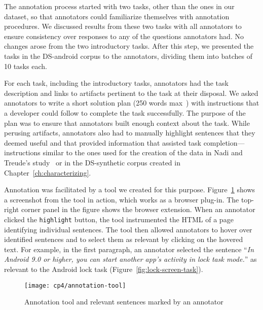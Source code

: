 The annotation process started with two tasks, other than the ones in our dataset, so that annotators could familiarize themselves with annotation procedures.
We discussed results from these two tasks with all annotators to ensure consistency over responses to any of the questions annotators had. No changes arose from the two introductory tasks.
After this step, we presented the  tasks in the \acs{DS-android} corpus to the annotators, dividing them into batches of 10 tasks each. 



For each task, including the introductory tasks, annotators had the task description and links to artifacts pertinent to the task at their disposal. We asked annotators to write a short solution plan (250 words max~\cite{Rastkar2010}) with instructions that a developer could follow to complete the task successfully. 
The purpose of the plan was to ensure that annotators built enough context about the task.
While perusing artifacts, annotators also had to manually highlight sentences that they deemed useful and that provided information that assisted task completion---instructions similar to the ones used for the creation of the data in Nadi and Treude's study~\cite{nadi2020}
or in the \acs{DS-synthetic} corpus created in Chapter~\ref{ch:characterizing}.


Annotation was facilitated by a tool we created for this purpose. 
Figure~\ref{fig:corpus-annotation-tool} shows a screenshot from the tool in 
action, which works as a browser plug-in. The top-right corner panel in the figure shows the browser extension. When an annotator clicked the \texttt{highlight} button, 
the tool instrumented the HTML of a page identifying individual sentences. The tool then allowed annotators to hover over identified sentences and to select them as relevant by clicking on the hovered text. For example, in the first paragraph, an annotator selected  the sentence
``\textit{In Android 9.0 or higher, you can start another app's activity in lock task mode.}'' as relevant to the Android lock task (Figure~\ref{fig:lock-screen-task}).







\begin{figure}
    \centering
    \texttt{[image: cp4/annotation-tool]}
    \caption{Annotation tool and relevant sentences marked by an annotator}
    \label{fig:corpus-annotation-tool}
\end{figure}


